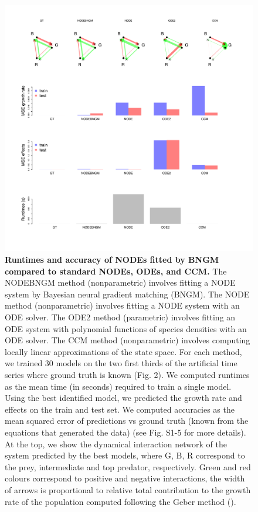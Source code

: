 \documentclass[11pt, oneside]{article}
\begin{document}
\newpage
\begin{figure}[H]
\begin{center}
\includegraphics[width=\linewidth]{figure_4.png}
\caption{
    \textbf{Runtimes and accuracy of NODEs fitted by BNGM compared to standard NODEs, ODEs, and CCM.} 
    The NODEBNGM method (nonparametric) involves fitting a NODE system by Bayesian neural gradient matching (BNGM).
    The NODE method (nonparametric) involves fitting a NODE system with an ODE solver. 
    The ODE2 method (parametric) involves fitting an ODE system with polynomial functions of species densities with an ODE solver. 
    The CCM method (nonparametric) involves computing locally linear approximations of the state space. 
    For each method, we trained 30 models on the two first thirds of the artificial time series where ground truth is known (Fig. 2). 
    We computed runtimes as the mean time (in seconds) required to train a single model. 
    Using the best identified model, we predicted the growth rate and effects on the train and test set. 
    We computed accuracies as the mean squared error of predictions vs ground truth (known from the equations that generated the data) (see Fig. S1-5 for more details). 
    At the top, we show the dynamical interaction network of the system predicted by the best models, where G, B, R correspond to the prey, intermediate and top predator, respectively.
    Green and red colours correspond to positive and negative interactions, the width of arrows is proportional to relative total contribution to the growth rate of the population computed following the Geber method (\cite{Hairston2005,Bonnaffe2021a}).
}
\end{center}
\end{figure}
\newpage
\end{document}
